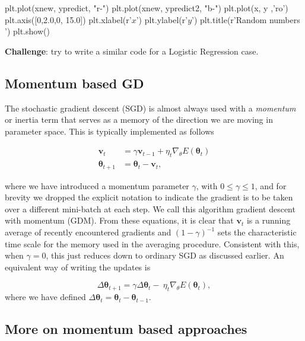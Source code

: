 \documentclass[%
oneside,                 %
final,                   %
10pt]{article}
\begin{document}
plt.plot(xnew, ypredict, "r-")
plt.plot(xnew, ypredict2, "b-")
plt.plot(x, y ,'ro')
plt.axis([0,2.0,0, 15.0])
plt.xlabel(r'$x$')
plt.ylabel(r'$y$')
plt.title(r'Random numbers ')
plt.show()

\epycod

\textbf{Challenge}: try to write a similar code for a Logistic Regression case.









\subsection{Momentum based GD}

The stochastic gradient descent (SGD) is almost always used with a
\emph{momentum} or inertia term that serves as a memory of the direction we
are moving in parameter space.  This is typically implemented as
follows

\begin{align}
\mathbf{v}_{t}&=\gamma \mathbf{v}_{t-1}+\eta_{t}\nabla_\theta E(\boldsymbol{\theta}_t) \nonumber \\
\boldsymbol{\theta}_{t+1}&= \boldsymbol{\theta}_t -\mathbf{v}_{t},
\end{align}

where we have introduced a momentum parameter $\gamma$, with
$0\le\gamma\le 1$, and for brevity we dropped the explicit notation to
indicate the gradient is to be taken over a different mini-batch at
each step. We call this algorithm gradient descent with momentum
(GDM). From these equations, it is clear that $\mathbf{v}_t$ is a
running average of recently encountered gradients and
$(1-\gamma)^{-1}$ sets the characteristic time scale for the memory
used in the averaging procedure. Consistent with this, when
$\gamma=0$, this just reduces down to ordinary SGD as discussed
earlier. An equivalent way of writing the updates is

\[
\Delta \boldsymbol{\theta}_{t+1} = \gamma \Delta \boldsymbol{\theta}_t -\ \eta_{t}\nabla_\theta E(\boldsymbol{\theta}_t),
\]
where we have defined $\Delta \boldsymbol{\theta}_{t}= \boldsymbol{\theta}_t-\boldsymbol{\theta}_{t-1}$.

\subsection{More on momentum based approaches}
\end{document}
